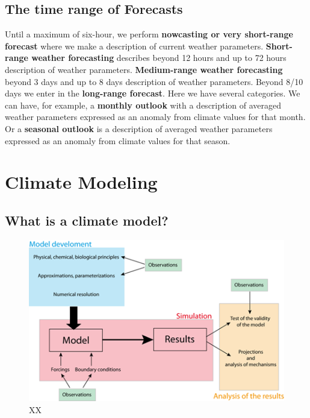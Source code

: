 \documentclass[12pt,oneside]{book}
\begin{document}
\subsection{The time range of
Forecasts}\label{the-time-range-of-forecasts}

Until a maximum of six-hour, we perform \textbf{nowcasting or very
short-range forecast} where we make a description of current weather
parameters. \textbf{Short-range weather forecasting} describes beyond 12
hours and up to 72 hours description of weather parameters.
\textbf{Medium-range weather forecasting} beyond 3 days and up to 8 days
description of weather parameters. Beyond 8/10 days we enter in the
\textbf{long-range forecast}. Here we have several categories. We can
have, for example, a \textbf{monthly outlook} with a description of
averaged weather parameters expressed as an anomaly from climate values
for that month. Or a \textbf{seasonal outlook} is a description of
averaged weather parameters expressed as an anomaly from climate values
for that season.

\section{Climate Modeling}\label{climate-modeling}

\subsection{What is a climate model?}\label{what-is-a-climate-model}

\begin{figure}

{\centering \includegraphics[width=0.8\linewidth]{figures/Figure78} 

}

\caption{XX}\label{fig:Whatisaclimatemodel}
\end{figure}
\end{document}
